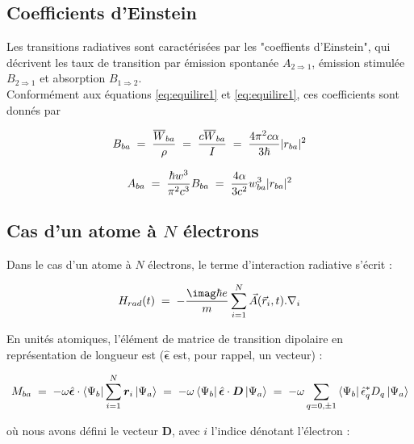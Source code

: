     \subsection{Coefficients d'Einstein}



Les transitions radiatives sont caractérisées par les "coeffients d'Einstein", qui décrivent les taux de transition par émission spontanée $A_{2\Rightarrow1}$, émission stimulée $B_{2\Rightarrow 1}$ et absorption $B_{1\Rightarrow2}$.\\
Conformément aux équations \eqref{eq:equilire1} et \eqref{eq:equilire1}, ces coefficients sont donnés par 

\begin{equation}
    B_{ba}\; = \; \dfrac{\overline{W}_{ba}}{\rho}\; = \; \dfrac{c\overline{W}_{ba}}{I}\; = \; \dfrac{4\pi^2 c \alpha}{3 \hbar}|r_{ba}|^2
\end{equation}

\begin{equation}
    A_{ba}\; = \; \dfrac{\hbar w^3}{\pi^2 c^3}B_{ba}\; = \; \dfrac{4 \alpha}{3 c^2}w_{ba}^3|r_{ba}|^2
\end{equation}





\subsection{Cas d'un atome à $N$ électrons}

Dans le cas d'un atome à $N$ électrons, le terme d'interaction radiative s'écrit : 

\begin{equation}
    H_{rad}(t)\eq -\dfrac{\imag\hbar e}{m}\sum_{i=1}^{N} \vec{A}(\vec{r}_i,t).\nabla_i
\end{equation}

En unités atomiques, l'élément de matrice de transition dipolaire en représentation de longueur est ($\hat{\bm{\epsilon}}$ est, pour rappel, un vecteur) :

\begin{equation}
    M_{ba} \; = \; 
    -\omega \hat{\bm{\epsilon}}\cdot\bra{\Psi_b}\sum_{i=1}^{N} \bm{r}_i\ket{\Psi_a}
    \; = \; 
    -\omega \bra{\Psi_b}\hat{\bm{\epsilon}} \cdot \bm{D}\ket{\Psi_a}
    \; = \;
    -\omega \sum_{q=0,\pm 1}\bra{\Psi_b}\hat{\epsilon}_q^* D_q\ket{\Psi_a}
\end{equation}

où nous avons défini le vecteur $\bm{D}$, avec $i$ l'indice dénotant l'électron :

